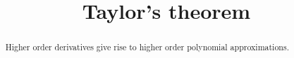 \documentclass{ximera}
\title{Taylor's theorem}
\begin{document}
\begin{abstract}
	Higher order derivatives give rise to higher order polynomial approximations.
\end{abstract}
\end{document}
